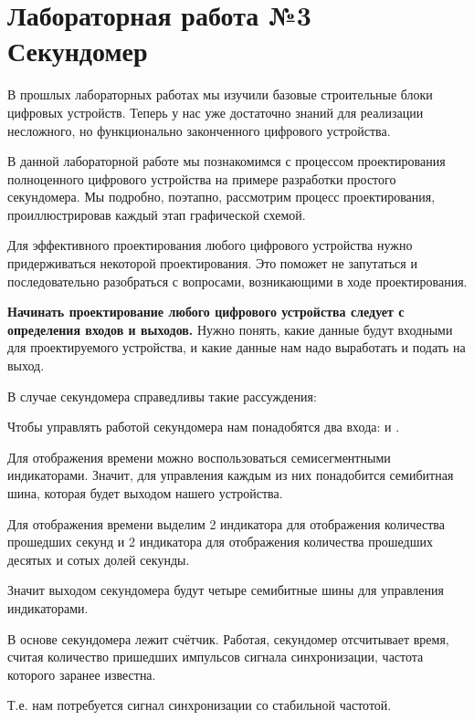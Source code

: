 \chapter{Лабораторная работа №3\\Секундомер} 

\par{В прошлых лабораторных работах мы изучили базовые строительные блоки цифровых устройств. Теперь у нас уже достаточно знаний для реализации несложного, но функционально законченного цифрового устройства.}

\par{В данной лабораторной работе мы познакомимся с процессом проектирования полноценного цифрового устройства на примере разработки простого секундомера. Мы подробно, поэтапно, рассмотрим процесс проектирования, проиллюстрировав каждый этап графической схемой.}

\par{Для эффективного проектирования любого цифрового устройства нужно придерживаться некоторой  проектирования. Это поможет не запутаться и последовательно разобраться с вопросами, возникающими в ходе проектирования.}

\par{\textbf{Начинать проектирование любого цифрового устройства следует с определения входов и выходов.} Нужно понять, какие данные будут входными для проектируемого устройства, и какие данные нам надо выработать и подать на выход.}

\vspace{4mm}
\par{В случае секундомера справедливы такие рассуждения:}
\par{Чтобы управлять работой секундомера нам понадобятся два входа:  и .}
\par{Для отображения времени можно воспользоваться семисегментными индикаторами. Значит, для управления каждым из них понадобится семибитная шина, которая будет выходом нашего устройства.}
\par{Для отображения времени выделим 2 индикатора для отображения количества прошедших секунд и 2 индикатора для отображения количества прошедших десятых и сотых долей секунды.}
\par{Значит выходом секундомера будут четыре семибитные шины для управления индикаторами.}
\par{В основе секундомера лежит счётчик. Работая, секундомер отсчитывает время, считая количество пришедших импульсов сигнала синхронизации, частота которого заранее известна.}
\par{Т.е. нам потребуется сигнал синхронизации со стабильной частотой.}
\vspace{4mm}

